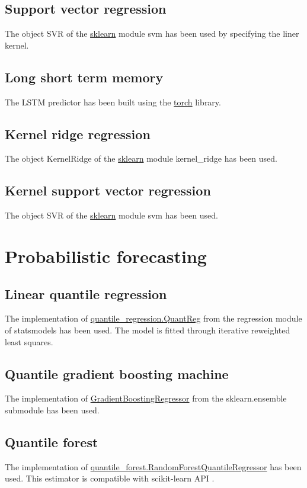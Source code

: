 \subsection{Support vector regression}
The object SVR of the \href{https://scikit-learn.org/stable/}{sklearn} module svm has been used by specifying the liner kernel.

\subsection{Long short term memory}
The LSTM predictor has been built using the \href{https://pytorch.org}{torch} library.

\subsection{Kernel ridge regression}
The object KernelRidge of the \href{https://scikit-learn.org/stable/}{sklearn} module kernel\_ridge has been used.

\subsection{Kernel support vector regression}
The object SVR of the \href{https://scikit-learn.org/stable/}{sklearn} module svm has been used.

\section{Probabilistic forecasting}
\subsection{Linear quantile regression}
The implementation of \href{https://www.statsmodels.org/dev/generated/statsmodels.regression.quantile_regression.QuantReg.html}{quantile\_regression.QuantReg} from the regression module of statsmodels has been used.
The model is fitted through iterative reweighted least squares.
\subsection{Quantile gradient boosting machine}
The implementation of \href{https://scikit-learn.org/stable/modules/generated/sklearn.ensemble.GradientBoostingRegressor.html}{GradientBoostingRegressor} from the sklearn.ensemble submodule has been used.
\subsection{Quantile forest}
The implementation of \href{https://pypi.org/project/quantile-forest/}{quantile\_forest.RandomForestQuantileRegressor} has been used. This estimator is compatible with scikit-learn API \cite{Johnson2024}.
